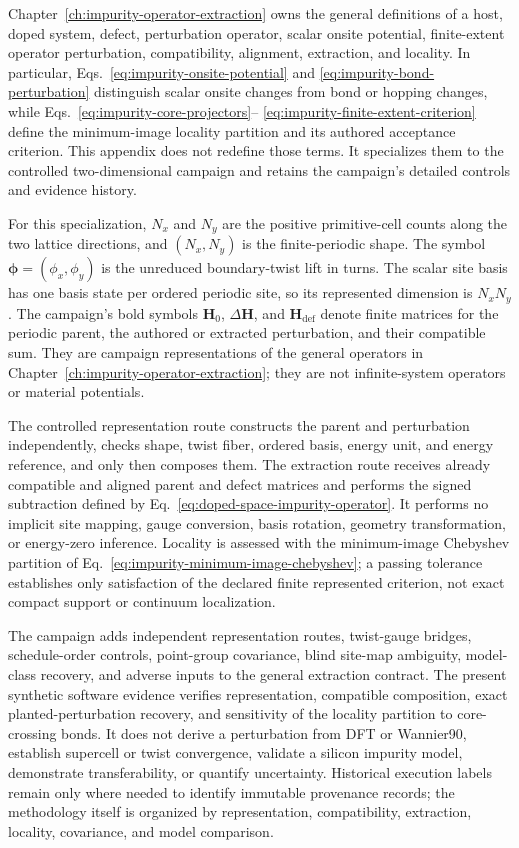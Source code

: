 Chapter~\ref{ch:impurity-operator-extraction} owns the general definitions of a
host, doped system, defect, perturbation operator, scalar onsite potential,
finite-extent operator perturbation, compatibility, alignment, extraction, and
locality. In particular, Eqs.~\eqref{eq:impurity-onsite-potential} and
\eqref{eq:impurity-bond-perturbation} distinguish scalar onsite changes from
bond or hopping changes, while Eqs.~\eqref{eq:impurity-core-projectors}--
\eqref{eq:impurity-finite-extent-criterion} define the minimum-image locality
partition and its authored acceptance criterion. This appendix does not redefine
those terms. It specializes them to the controlled two-dimensional campaign and
retains the campaign's detailed controls and evidence history.

For this specialization, $N_x$ and $N_y$ are the positive primitive-cell counts
along the two lattice directions, and $(N_x,N_y)$ is the finite-periodic shape.
The symbol $\boldsymbol\phi=(\phi_x,\phi_y)$ is the unreduced boundary-twist
lift in turns. The scalar site basis has one basis state per ordered periodic
site, so its represented dimension is $N_xN_y$. The campaign's bold symbols
$\mathbf H_0$, $\Delta\mathbf H$, and $\mathbf H_{\mathrm{def}}$ denote finite
matrices for the periodic parent, the authored or extracted perturbation, and
their compatible sum. They are campaign representations of the general
operators in Chapter~\ref{ch:impurity-operator-extraction}; they are not
infinite-system operators or material potentials.

The controlled representation route constructs the parent and perturbation
independently, checks shape, twist fiber, ordered basis, energy unit, and energy
reference, and only then composes them. The extraction route receives already
compatible and aligned parent and defect matrices and performs the signed
subtraction defined by Eq.~\eqref{eq:doped-space-impurity-operator}. It performs
no implicit site mapping, gauge conversion, basis rotation, geometry
transformation, or energy-zero inference. Locality is assessed with the
minimum-image Chebyshev partition of
Eq.~\eqref{eq:impurity-minimum-image-chebyshev}; a passing tolerance establishes
only satisfaction of the declared finite represented criterion, not exact
compact support or continuum localization.

The campaign adds independent representation routes, twist-gauge bridges,
schedule-order controls, point-group covariance, blind site-map ambiguity,
model-class recovery, and adverse inputs to the general extraction contract.
The present synthetic software evidence verifies representation, compatible
composition, exact planted-perturbation recovery, and sensitivity of the
locality partition to core-crossing bonds. It does not derive a perturbation
from DFT or Wannier90, establish supercell or twist convergence, validate a
silicon impurity model, demonstrate transferability, or quantify uncertainty.
Historical execution labels remain only where needed to identify immutable
provenance records; the methodology itself is organized by representation,
compatibility, extraction, locality, covariance, and model comparison.

